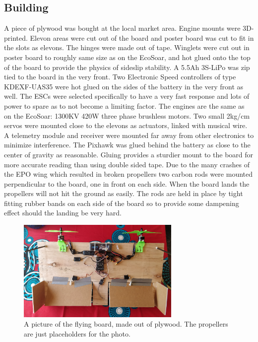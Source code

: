 \documentclass{article}
\begin{document}
\subsection{Building}
A piece of plywood was bought at the local market area.
Engine mounts were 3D-printed.
Elevon areas were cut out of the board and poster board was cut to fit in the slots as elevons.
The hinges were made out of tape.
Winglets were cut out in poster board to roughly same size as on the EcoSoar, and hot glued onto the top of the board to provide the physics of sideslip stability.
A 5.5Ah 3S-LiPo was zip tied to the board in the very front.
Two Electronic Speed controllers of type KDEXF-UAS35 were hot glued on the sides of the battery in the very front as well.
The ESCs were selected specifically to have a very fast response and lots of power to spare as to not become a limiting factor.
The engines are the same as on the EcoSoar: 1300KV 420W three phase brushless motors.
Two small 2kg/cm servos were mounted close to the elevons as actuators, linked with musical wire.
A telemetry module and receiver were mounted far away from other electronics to minimize interference.
The Pixhawk was glued behind the battery as close to the center of gravity as reasonable.
Gluing provides a sturdier mount to the board for more accurate reading than using double sided tape.
Due to the many crashes of the EPO wing which resulted in broken propellers two carbon rods were mounted perpendicular to the board, one in front on each side.
When the board lands the propellers will not hit the ground as easily.
The rods are held in place by tight fitting rubber bands on each side of the board so to provide some dampening effect should the landing be very hard.

\begin{figure}
    \center
    \includegraphics[width=0.7\textwidth]{FlyingBoard.jpg}
    \caption{A picture of the flying board, made out of plywood. The propellers are just placeholders for the photo.}
\end{figure}
\end{document}
